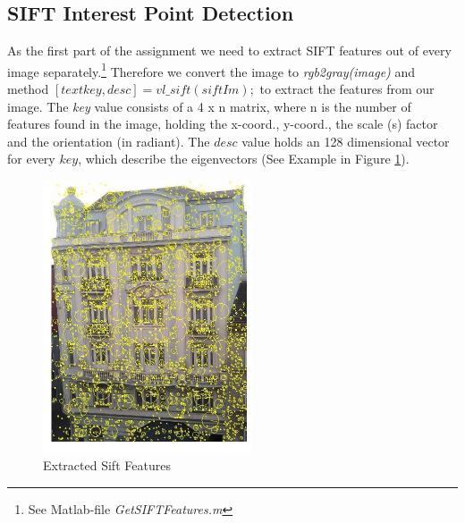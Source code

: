 \documentclass[subfigure,epsfig,fleqn,float,numbers=noenddot]{scrartcl}
\begin{document}
\subsection{SIFT Interest Point Detection}
\label{sec:A}
As the first part of the assignment we need to extract SIFT features out of every image separately.\footnote{See Matlab-file \emph{GetSIFTFeatures.m} } Therefore we convert the image to \emph{rgb2gray(image)} and method $[text{key, desc}] = vl\_sift(siftIm);$ to extract the features from our image. The \emph{key} value consists of a 4 x n matrix, where n is the number of features found in the image, holding the x-coord., y-coord., the scale (s) factor and the orientation (in radiant). The $desc$ value holds an 128 dimensional vector for every $key$, which describe the eigenvectors (See Example in Figure \ref{img:sift}). 
	\begin{figure}[H]
		\centering
		\includegraphics[width=0.55\textwidth]{./img/siftDesc2.jpg}
		\caption{Extracted Sift Features}
		\label{img:sift}
	\end{figure}
\end{document}
